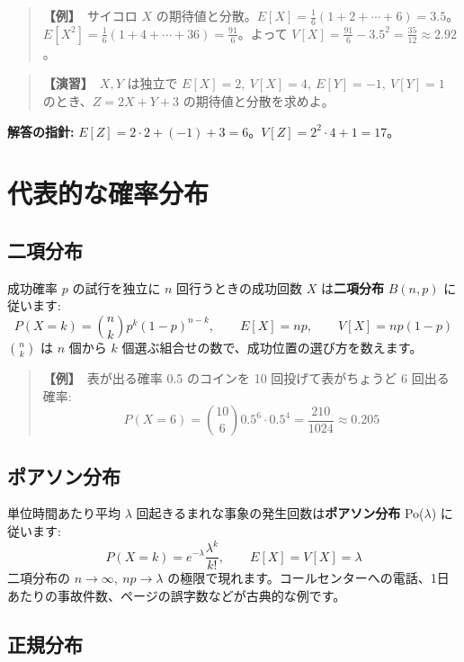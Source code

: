 \documentclass{article}
\begin{document}
\begin{quote}
\textbf{【例】}\ サイコロ \(X\) の期待値と分散。\(E[X] = \frac{1}{6}(1 + 2 + \cdots + 6) = 3.5\)。\(E[X^2] = \frac{1}{6}(1 + 4 + \cdots + 36) = \frac{91}{6}\)。よって \(V[X] = \frac{91}{6} - 3.5^2 = \frac{35}{12} \approx 2.92\)。
\end{quote}

\begin{quote}
\textbf{【演習】}\ \(X, Y\) は独立で \(E[X] = 2,\ V[X] = 4,\ E[Y] = -1,\ V[Y] = 1\) のとき、\(Z = 2X + Y + 3\) の期待値と分散を求めよ。
\end{quote}

\textbf{解答の指針:} \(E[Z] = 2 \cdot 2 + (-1) + 3 = 6\)。\(V[Z] = 2^2 \cdot 4 + 1 = 17\)。

\section{代表的な確率分布}

\subsection{二項分布}

成功確率 \(p\) の試行を独立に \(n\) 回行うときの成功回数 \(X\) は\textbf{二項分布} \(B(n, p)\) に従います:
\[ P(X = k) = \binom{n}{k} p^k (1-p)^{n-k}, \qquad E[X] = np, \qquad V[X] = np(1-p) \]
\(\binom{n}{k}\) は \(n\) 個から \(k\) 個選ぶ組合せの数で、成功位置の選び方を数えます。

\begin{quote}
\textbf{【例】}\ 表が出る確率 0.5 のコインを 10 回投げて表がちょうど 6 回出る確率:
\[ P(X = 6) = \binom{10}{6} 0.5^6 \cdot 0.5^4 = \frac{210}{1024} \approx 0.205 \]
\end{quote}

\subsection{ポアソン分布}

単位時間あたり平均 \(\lambda\) 回起きるまれな事象の発生回数は\textbf{ポアソン分布} Po(\(\lambda\)) に従います:
\[ P(X = k) = e^{-\lambda} \frac{\lambda^k}{k!}, \qquad E[X] = V[X] = \lambda \]
二項分布の \(n \to \infty,\ np \to \lambda\) の極限で現れます。コールセンターへの電話、1日あたりの事故件数、ページの誤字数などが古典的な例です。

\subsection{正規分布}
\end{document}
